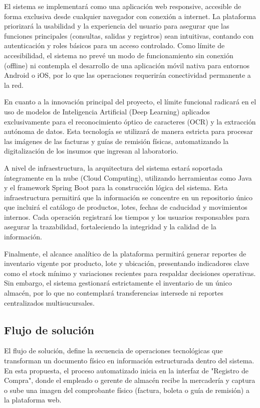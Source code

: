 \documentclass[12pt,a4paper]{article}
\begin{document}
El sistema se implementará como una aplicación web responsive, accesible de forma exclusiva desde cualquier navegador con conexión a internet. La plataforma priorizará la usabilidad y la experiencia del usuario para asegurar que las funciones principales (consultas, salidas y registros) sean intuitivas, contando con autenticación y roles básicos para un acceso controlado. Como límite de accesibilidad, el sistema no prevé un modo de funcionamiento sin conexión (offline) ni contempla el desarrollo de una aplicación móvil nativa para entornos Android o iOS, por lo que las operaciones requerirán conectividad permanente a la red.

En cuanto a la innovación principal del proyecto, el límite funcional radicará en el uso de modelos de Inteligencia Artificial (Deep Learning) aplicados exclusivamente para el reconocimiento óptico de caracteres (OCR) y la extracción autónoma de datos. Esta tecnología se utilizará de manera estricta para procesar las imágenes de las facturas y guías de remisión físicas, automatizando la digitalización de los insumos que ingresan al laboratorio.

A nivel de infraestructura, la arquitectura del sistema estará soportada íntegramente en la nube (Cloud Computing), utilizando herramientas como Java y el framework Spring Boot para la construcción lógica del sistema. Esta infraestructura permitirá que la información se concentre en un repositorio único que incluirá el catálogo de productos, lotes, fechas de caducidad y movimientos internos. Cada operación registrará los tiempos y los usuarios responsables para asegurar la trazabilidad, fortaleciendo la integridad y la calidad de la información.

Finalmente, el alcance analítico de la plataforma permitirá generar reportes de inventario vigente por producto, lote y ubicación, presentando indicadores clave como el stock mínimo y variaciones recientes para respaldar decisiones operativas. Sin embargo, el sistema gestionará estrictamente el inventario de un único almacén, por lo que no contemplará transferencias intersede ni reportes centralizados multisucursales.

\subsection{Flujo de solución}

El flujo de solución, define la secuencia de operaciones tecnológicas que transforman un documento físico en información estructurada dentro del sistema. En esta propuesta, el proceso automatizado inicia en la interfaz de "Registro de Compra", donde el empleado o gerente de almacén recibe la mercadería y captura o sube una imagen del comprobante físico (factura, boleta o guía de remisión) a la plataforma web.
\end{document}
